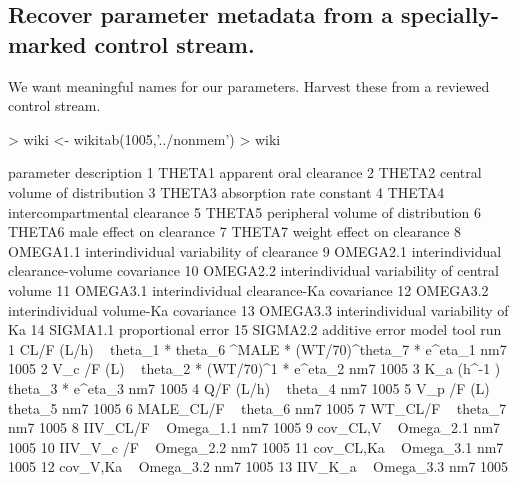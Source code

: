\subsection{Recover parameter metadata from a specially-marked control stream.}
We want meaningful names for our parameters.  Harvest these from a reviewed control
stream.
\begin{Schunk}
\begin{Sinput}
> wiki <- wikitab(1005,'../nonmem')
> wiki
\end{Sinput}
\begin{Soutput}
   parameter                                   description
1     THETA1                       apparent oral clearance
2     THETA2                central volume of distribution
3     THETA3                      absorption rate constant
4     THETA4                  intercompartmental clearance
5     THETA5             peripheral volume of distribution
6     THETA6                      male effect on clearance
7     THETA7                    weight effect on clearance
8   OMEGA1.1      interindividual variability of clearance
9   OMEGA2.1   interindividual clearance-volume covariance
10  OMEGA2.2 interindividual variability of central volume
11  OMEGA3.1       interindividual clearance-Ka covariance
12  OMEGA3.2          interindividual volume-Ka covariance
13  OMEGA3.3             interindividual variability of Ka
14  SIGMA1.1                            proportional error
15  SIGMA2.2                                additive error
                                                               model tool  run
1  CL/F (L/h) ~ theta_1 * theta_6 ^MALE * (WT/70)^theta_7  * e^eta_1  nm7 1005
2                         V_c /F (L) ~ theta_2 * (WT/70)^1 * e^eta_2  nm7 1005
3                                    K_a (h^-1 ) ~ theta_3 * e^eta_3  nm7 1005
4                                                Q/F (L/h) ~ theta_4  nm7 1005
5                                               V_p /F (L) ~ theta_5  nm7 1005
6                                                MALE_CL/F ~ theta_6  nm7 1005
7                                                  WT_CL/F ~ theta_7  nm7 1005
8                                               IIV_CL/F ~ Omega_1.1  nm7 1005
9                                               cov_CL,V ~ Omega_2.1  nm7 1005
10                                            IIV_V_c /F ~ Omega_2.2  nm7 1005
11                                            cov_CL,Ka  ~ Omega_3.1  nm7 1005
12                                             cov_V,Ka  ~ Omega_3.2  nm7 1005
13                                              IIV_K_a  ~ Omega_3.3  nm7 1005

\end{Soutput}
\end{Schunk}

